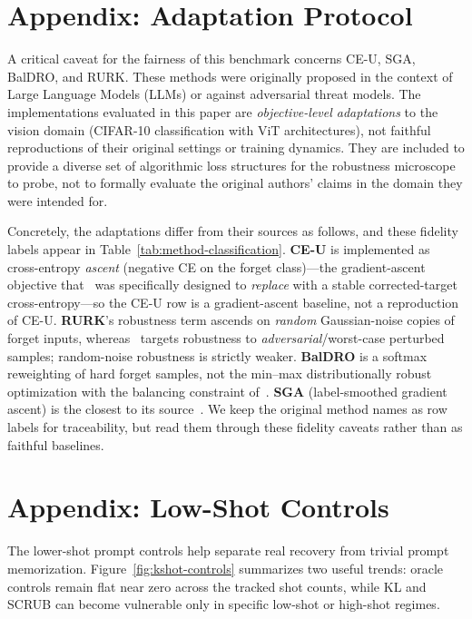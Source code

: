 \documentclass[11pt]{article}
\begin{document}
\section{Appendix: Adaptation Protocol}
\label{sec:adaptation}
A critical caveat for the fairness of this benchmark concerns CE-U, SGA, BalDRO, and RURK. These methods were originally proposed in the context of Large Language Models (LLMs) or against adversarial threat models. The implementations evaluated in this paper are \emph{objective-level adaptations} to the vision domain (CIFAR-10 classification with ViT architectures), not faithful reproductions of their original settings or training dynamics. They are included to provide a diverse set of algorithmic loss structures for the robustness microscope to probe, not to formally evaluate the original authors' claims in the domain they were intended for.

Concretely, the adaptations differ from their sources as follows, and these fidelity labels appear in Table~\ref{tab:method-classification}. \textbf{CE-U} is implemented as cross-entropy \emph{ascent} (negative CE on the forget class)---the gradient-ascent objective that~\cite{yang2025ceu} was specifically designed to \emph{replace} with a stable corrected-target cross-entropy---so the CE-U row is a gradient-ascent baseline, not a reproduction of CE-U. \textbf{RURK}'s robustness term ascends on \emph{random} Gaussian-noise copies of forget inputs, whereas~\cite{hsu2025rurk} targets robustness to \emph{adversarial}/worst-case perturbed samples; random-noise robustness is strictly weaker. \textbf{BalDRO} is a softmax reweighting of hard forget samples, not the min--max distributionally robust optimization with the balancing constraint of~\cite{shao2026baldro}. \textbf{SGA} (label-smoothed gradient ascent) is the closest to its source~\cite{pang2025sga}. We keep the original method names as row labels for traceability, but read them through these fidelity caveats rather than as faithful baselines.

\section{Appendix: Low-Shot Controls}
The lower-shot prompt controls help separate real recovery from trivial prompt memorization. Figure~\ref{fig:kshot-controls} summarizes two useful trends: oracle controls remain flat near zero across the tracked shot counts, while KL and SCRUB can become vulnerable only in specific low-shot or high-shot regimes.
\end{document}
